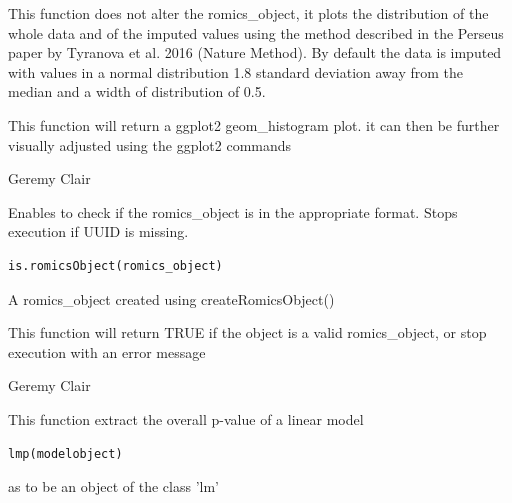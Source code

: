 \documentclass[a4paper]{book}
\begin{document}
%
\begin{Details}
This function does not alter the romics\_object, it plots the distribution of the whole data and of the imputed values using the method described in the Perseus paper by Tyranova et al. 2016 (Nature Method). By default the data is imputed with values in a normal distribution 1.8 standard deviation away from the median  and a width of distribution of 0.5.
\end{Details}
%
\begin{Value}
This function will return a ggplot2 geom\_histogram plot. it can then be further visually adjusted using the ggplot2 commands
\end{Value}
%
\begin{Author}
Geremy Clair
\end{Author}
%
\begin{Description}
Enables to check if the romics\_object is in the appropriate format. Stops execution if UUID is missing.
\end{Description}
%
\begin{Usage}
\begin{verbatim}
is.romicsObject(romics_object)
\end{verbatim}
\end{Usage}
%
\begin{Arguments}
\begin{ldescription}
\item[\code{romics\_object}] A romics\_object created using createRomicsObject()
\end{ldescription}
\end{Arguments}
%
\begin{Value}
This function will return TRUE if the object is a valid romics\_object, or stop execution with an error message
\end{Value}
%
\begin{Author}
Geremy Clair
\end{Author}
%
\begin{Description}
This function extract the overall p-value of a linear model
\end{Description}
%
\begin{Usage}
\begin{verbatim}
lmp(modelobject)
\end{verbatim}
\end{Usage}
%
\begin{Arguments}
\begin{ldescription}
\item[\code{modelobject}] as to be an object of the class 'lm'
\end{ldescription}
\end{Arguments}
\end{document}
